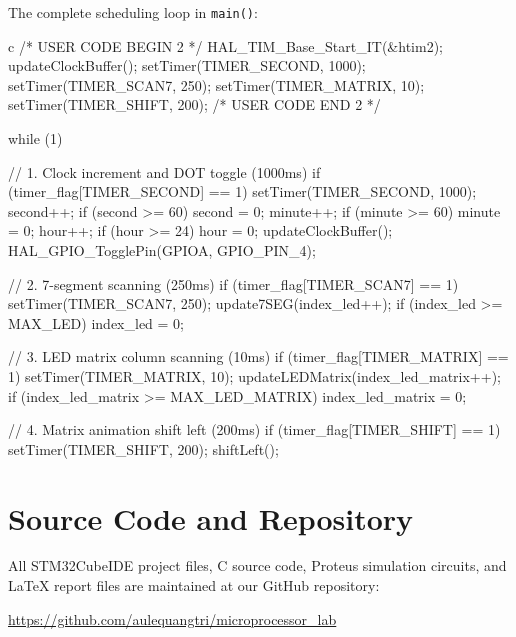 \documentclass{hcmut-report}
\begin{document}
The complete scheduling loop in \texttt{main()}:
\begin{code}{c}
/* USER CODE BEGIN 2 */
HAL_TIM_Base_Start_IT(&htim2);
updateClockBuffer();
setTimer(TIMER_SECOND, 1000);
setTimer(TIMER_SCAN7, 250);
setTimer(TIMER_MATRIX, 10);
setTimer(TIMER_SHIFT, 200);
/* USER CODE END 2 */

while (1)
{
    // 1. Clock increment and DOT toggle (1000ms)
    if (timer_flag[TIMER_SECOND] == 1) {
        setTimer(TIMER_SECOND, 1000);
        second++;
        if (second >= 60) {
            second = 0;
            minute++;
        }
        if (minute >= 60) {
            minute = 0;
            hour++;
        }
        if (hour >= 24) {
            hour = 0;
        }
        updateClockBuffer();
        HAL_GPIO_TogglePin(GPIOA, GPIO_PIN_4);
    }

    // 2. 7-segment scanning (250ms)
    if (timer_flag[TIMER_SCAN7] == 1) {
        setTimer(TIMER_SCAN7, 250);
        update7SEG(index_led++);
        if (index_led >= MAX_LED) index_led = 0;
    }

    // 3. LED matrix column scanning (10ms)
    if (timer_flag[TIMER_MATRIX] == 1) {
        setTimer(TIMER_MATRIX, 10);
        updateLEDMatrix(index_led_matrix++);
        if (index_led_matrix >= MAX_LED_MATRIX) index_led_matrix = 0;
    }

    // 4. Matrix animation shift left (200ms)
    if (timer_flag[TIMER_SHIFT] == 1) {
        setTimer(TIMER_SHIFT, 200);
        shiftLeft();
    }
}
\end{code}

\section{Source Code and Repository}
All STM32CubeIDE project files, C source code, Proteus simulation circuits, and \LaTeX{} report files are maintained at our GitHub repository:
\begin{center}
    \url{https://github.com/aulequangtri/microprocessor_lab}
\end{center}
\end{document}
